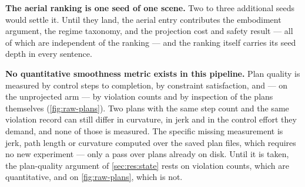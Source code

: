 \textbf{The aerial ranking is one seed of one scene.} Two to three additional seeds would settle it.
Until they land, the aerial entry contributes the embodiment argument, the regime taxonomy, and the
projection cost and safety result --- all of which are independent of the ranking --- and the
ranking itself carries its seed depth in every sentence.

\textbf{No quantitative smoothness metric exists in this pipeline.} Plan quality is measured by
control steps to completion, by constraint satisfaction, and --- on the unprojected arm --- by
violation counts and by inspection of the plans themselves (\autoref{fig:raw-plans}). Two plans with
the same step count and the same violation record can still differ in curvature, in jerk and in the
control effort they demand, and none of those is measured. The specific missing measurement is jerk,
path length or curvature computed over the saved plan files, which requires no new experiment ---
only a pass over plans already on disk. Until it is taken, the plan-quality argument of
\autoref{sec:res:state} rests on violation counts, which are quantitative, and on
\autoref{fig:raw-plans}, which is not.
